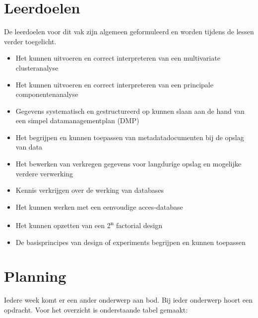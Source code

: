 \section{Leerdoelen}
De leerdoelen voor dit vak zijn algemeen geformuleerd en worden tijdens de lessen verder toegelicht.
\begin{itemize}
    \item Het kunnen uitvoeren en correct interpreteren van een multivariate clusteranalyse
    \item Het kunnen uitvoeren en correct interpreteren van een principale componentenanalyse
    \item Gegevens systematisch en gestructureerd op kunnen slaan aan de hand van een simpel datamanagementplan (DMP)
    \item Het begrijpen en kunnen toepassen van metadatadocumenten bij de opslag van data
    \item Het bewerken van verkregen gegevens voor langdurige opslag en mogelijke verdere verwerking
    \item Kennis verkrijgen over de werking van databases
    \item Het kunnen werken met een eenvoudige acces-database
    \item Het kunnen opzetten van een 2\textsuperscript{n} factorial design
    \item De basisprincipes van design of experiments begrijpen en kunnen toepassen
\end{itemize}

\section{Planning}

Iedere week komt er een ander onderwerp aan bod. Bij ieder onderwerp hoort een opdracht. Voor het overzicht is onderstaande tabel gemaakt:

